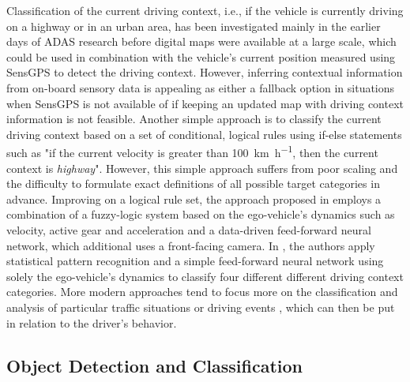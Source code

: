 Classification of the current driving context, i.e., if the vehicle is currently driving on a highway or in an urban area, has been investigated mainly in the earlier days of \ac{ADAS} research before digital maps were available at a large scale, which could be used in combination with the vehicle's current position measured using \ac{SensGPS} to detect the driving context.
However, inferring contextual information from on-board sensory data is appealing as either a fallback option in situations when \ac{SensGPS} is not available of if keeping an updated map with driving context information is not feasible.
Another simple approach is to classify the current driving context based on a set of conditional, logical rules using if-else statements such as "if the current velocity is greater than \SI{100}{\kilo\meter\per\hour}, then the current context is \emph{highway}".
However, this simple approach suffers from poor scaling and the difficulty to formulate exact definitions of all possible target categories in advance.
Improving on a logical rule set, the approach proposed in \cite{Hauptmann1996} employs a combination of a fuzzy-logic system based on the ego-vehicle's dynamics such as velocity, active gear and acceleration and a data-driven feed-forward neural network, which additional uses a front-facing camera.
In \cite{Engstrom2001}, the authors apply statistical pattern recognition and a simple feed-forward neural network using solely the ego-vehicle's dynamics to classify four different different driving context categories.
More modern approaches tend to focus more on the classification and analysis of particular traffic situations \cite{Hermann2008} or driving events \cite{Dagostino2013}, which can then be put in relation to the driver's behavior.

\subsection{Object Detection and Classification}
\label{subsec:obj_detect}

